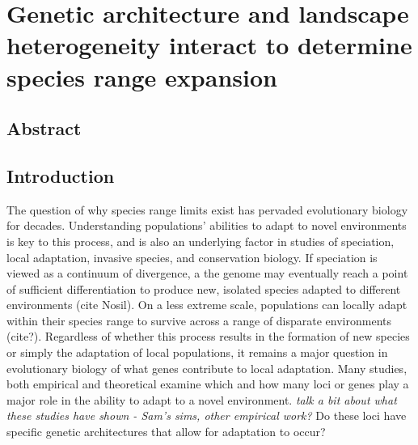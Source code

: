 \chapter{Genetic architecture and landscape heterogeneity interact to determine species range expansion}%
\label{chap:heterogeneouslandscapes}

\section{Abstract}


\section{Introduction}




The question of why species range limits exist has pervaded evolutionary biology for decades. Understanding populations' abilities to adapt to novel environments is key to this process, and is also an underlying factor in studies of speciation, local adaptation, invasive species, and conservation biology. 
If speciation is viewed as a continuum of divergence, a the genome may eventually reach a point of sufficient differentiation to produce new, isolated species adapted to different environments (cite Nosil). On a less extreme scale, populations can locally adapt within their species range to survive across a range of disparate environments (cite?). 
Regardless of whether this process results in the formation of new species or simply the adaptation of local populations, it remains a major question in evolutionary biology of what genes contribute to local adaptation. Many studies, both empirical and theoretical examine  which and how many loci or genes play a major role in the ability to adapt to a novel environment. \emph{talk a bit about what these studies have shown - Sam's sims, other empirical work?} Do these loci have specific genetic architectures that allow for adaptation to occur? 

